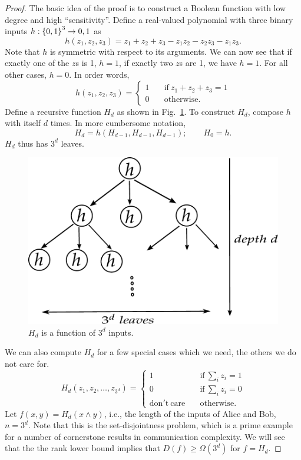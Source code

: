 \documentclass[letterpaper]{article}
\providecommand\cbrac[1]{\ensuremath \left\{#1\right\}}
\providecommand{\aand}{\wedge}
\newcommand{\df}{D(f)}
\begin{document}
\begin{proof}
The basic idea of the proof is to construct a Boolean function with low degree and high ``sensitivity''. Define a real-valued polynomial with three binary inputs $h : \cbrac{0,1}^3 \to {0,1}$ as
$$
h(z_1, z_2, z_3) = z_1 + z_2 + z_3 - z_1 z_2 - z_2 z_3 - z_1 z_3.
$$
Note that $h$ is symmetric with respect to its arguments. We can now see that if exactly one of the $z$s is 1, $h = 1$, if exactly two $z$s are 1, we have $h = 1$. For all other cases, $h = 0$. In order words,
$$
h(z_1, z_2, z_3) = 
\begin{cases}
1 & \quad \mathrm{if}\ z_1 + z_2 + z_3 = 1\\
0 & \quad \mathrm{otherwise}.
\end{cases}
$$
Define a recursive function $H_d$ as shown in Fig.~\ref{fig:H_d}. To construct $H_d$, compose $h$ with itself $d$ times. In more cumbersome notation,
$$
H_d = h(H_{d-1}, H_{d-1}, H_{d-1}); \qquad H_0 = h.
$$
$H_d$ thus has $3^d$ leaves.

\begin{figure}
\centering
\includegraphics[width=0.5 \textwidth]{H_d.pdf}
\caption{$H_d$ is a function of $3^d$ inputs.}
\label{fig:H_d}
\end{figure}

We can also compute $H_d$ for a few special cases which we need, the others we do not care for.
$$
H_d(z_1, z_2, \ldots, z_{3^d}) =
\begin{cases}
1 & \quad \mathrm{if}\ \sum_{i} z_i = 1\\
0 & \quad \mathrm{if}\ \sum_{i} z_i = 0\\
\mathrm{don't\ care} & \quad \mathrm{otherwise}.
\end{cases}
$$
Let $f(x,y) = H_d(x \aand y)$, i.e., the length of the inputs of Alice and Bob, $n = 3^d$. Note that this is the set-disjointness problem, which is a prime example for a number of cornerstone results in communication complexity. We will see that the the rank lower bound implies that $\df \geq \Omega(3^d)$ for $f = H_d$.


\end{proof}
\end{document}
